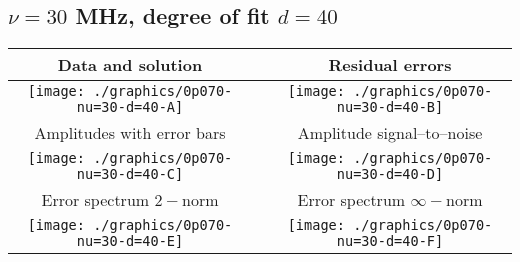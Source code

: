 

% 

\clearpage{}
\break{}

\subsection{$\nu = 30$ MHz, degree of fit $d = 40$}

\begin{table}[h]
    \begin{center}
        \begin{tabular}{ccc}
            Data and solution & \quad & Residual errors \\\hline
            \texttt{[image: ./graphics/0p070-nu=30-d=40-A]} &&
            \texttt{[image: ./graphics/0p070-nu=30-d=40-B]} \\[15pt]
            Amplitudes with error bars && Amplitude signal--to--noise \\\hline
            \texttt{[image: ./graphics/0p070-nu=30-d=40-C]} &&
            \texttt{[image: ./graphics/0p070-nu=30-d=40-D]} \\[15pt]
            Error spectrum $2-$norm && Error spectrum $\infty-$norm \\\hline
            \texttt{[image: ./graphics/0p070-nu=30-d=40-E]} &&
            \texttt{[image: ./graphics/0p070-nu=30-d=40-F]} \\[15pt]
        \end{tabular}
    \end{center}
\label{fig:elev=70, nu=30}
\end{table}



\endinput
